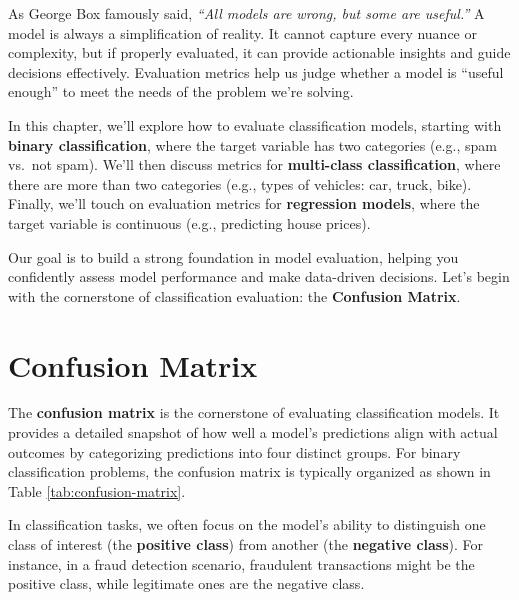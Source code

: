 \documentclass[
]{book}
\theoremstyle{definition}
\theoremstyle{definition}
\theoremstyle{definition}
\theoremstyle{definition}
\theoremstyle{remark}
\begin{document}
As George Box famously said, \emph{``All models are wrong, but some are useful.''} A model is always a simplification of reality. It cannot capture every nuance or complexity, but if properly evaluated, it can provide actionable insights and guide decisions effectively. Evaluation metrics help us judge whether a model is ``useful enough'' to meet the needs of the problem we're solving.

In this chapter, we'll explore how to evaluate classification models, starting with \textbf{binary classification}, where the target variable has two categories (e.g., spam vs.~not spam). We'll then discuss metrics for \textbf{multi-class classification}, where there are more than two categories (e.g., types of vehicles: car, truck, bike). Finally, we'll touch on evaluation metrics for \textbf{regression models}, where the target variable is continuous (e.g., predicting house prices).

Our goal is to build a strong foundation in model evaluation, helping you confidently assess model performance and make data-driven decisions. Let's begin with the cornerstone of classification evaluation: the \textbf{Confusion Matrix}.

\section{Confusion Matrix}\label{confusion-matrix}

The \textbf{confusion matrix} is the cornerstone of evaluating classification models. It provides a detailed snapshot of how well a model's predictions align with actual outcomes by categorizing predictions into four distinct groups. For binary classification problems, the confusion matrix is typically organized as shown in Table \ref{tab:confusion-matrix}.

In classification tasks, we often focus on the model's ability to distinguish one class of interest (the \textbf{positive class}) from another (the \textbf{negative class}). For instance, in a fraud detection scenario, fraudulent transactions might be the positive class, while legitimate ones are the negative class.
\end{document}
